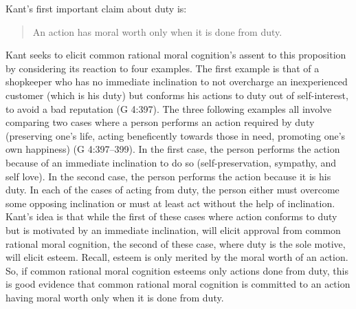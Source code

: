 Kant's first important claim about duty is:

\begin{quote}
	An action has moral worth only when it is done from duty.
\end{quote}

Kant seeks to elicit common rational moral cognition's assent to this proposition by considering its reaction to four examples. The first example is that of a shopkeeper who has no immediate inclination to not overcharge an inexperienced customer (which is his duty) but conforms his actions to duty out of self-interest, to avoid a bad reputation (G 4:397). The three following examples all involve comparing two cases where a person performs an action required by duty (preserving one's life, acting beneficently towards those in need, promoting one's own happiness) (G 4:397--399). In the first case, the person performs the action because of an immediate inclination to do so (self-preservation, sympathy, and self love). In the second case, the person performs the action because it is his duty. In each of the cases of acting from duty, the person either must overcome some opposing inclination or must at least act without the help of inclination. Kant's idea is that while the first of these cases where action conforms to duty but is motivated by an immediate inclination, will elicit approval from common rational moral cognition, the second of these case, where duty is the sole motive, will elicit esteem. Recall, esteem is only merited by the moral worth of an action. So, if common rational moral cognition esteems only actions done from duty, this is good evidence that common rational moral cognition is committed to an action having moral worth only when it is done from duty. \change

% 

